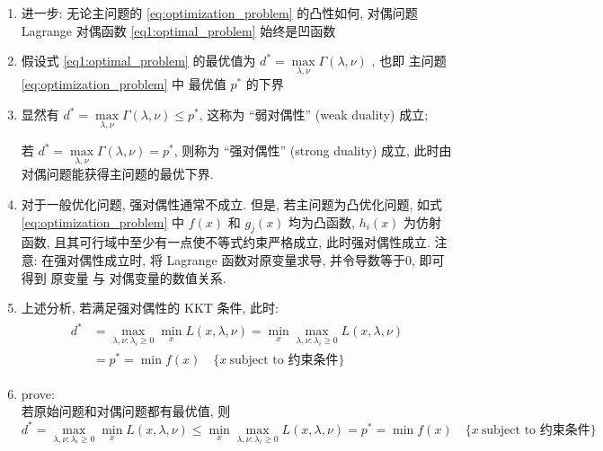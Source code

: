 \documentclass[oneside, 12pt]{ctexbook}
\begin{document}
\begin{enumerate}
					\item 进一步: 无论主问题的 \ref{eq:optimization_problem} 的凸性如何, 对偶问题 Lagrange 对偶函数 \ref{eq1:optimal_problem} 始终是凹函数
					
					\item 假设式 \ref{eq1:optimal_problem} 的最优值为 $d^* = \max\limits_{\lambda, \nu} \Gamma(\lambda, \nu)$ , 也即 主问题 \ref{eq:optimization_problem} 中 最优值 $p^*$ 的下界
					
					\item 显然有 $d^* = \max\limits_{\lambda, \nu} \Gamma(\lambda, \nu) \leq p^*$, 这称为 “弱对偶性” (weak duality) 成立; 
					
					  	  若 $d^* = \max\limits_{\lambda, \nu} \Gamma(\lambda, \nu) = p^*$, 则称为 “强对偶性” (strong duality) 成立, 此时由对偶问题能获得主问题的最优下界. 
						
					\item 对于一般优化问题, 强对偶性通常不成立. 但是, 若主问题为凸优化问题, 如式 \ref{eq:optimization_problem} 中 $f(x)$ 和 $g_j(x)$ 均为凸函数, $h_i(x)$ 为仿射函数, 且其可行域中至少有一点使不等式约束严格成立, 此时强对偶性成立. 注意: 在强对偶性成立时, 将 Lagrange 函数对原变量求导, 并令导数等于0, 即可得到 原变量 与 对偶变量的数值关系. 
					
					\item 上述分析, 若满足强对偶性的 KKT 条件, 此时: 
						\begin{align}
							\begin{split}
								d^* &= \max\limits_{\lambda, \nu: \lambda_i \geq 0} \min\limits_x L(x, \lambda, \nu) = \min\limits_x\max\limits_{\lambda, \nu: \lambda_i \geq 0} L(x, \lambda, \nu) \\
								&= p^* = \min f(x) \quad \{ x \ \text{subject to 约束条件} \}
							\end{split}
						\end{align}
					 
					 \item prove:\\ 若原始问题和对偶问题都有最优值, 则 $d^* = \max\limits_{\lambda, \nu: \lambda_i \geq 0} \min\limits_x L(x, \lambda, \nu) \leq \min\limits_x\max\limits_{\lambda, \nu: \lambda_i \geq 0} L(x, \lambda, \nu) 
					 = p^* = \min f(x) \quad \{ x \ \text{subject to 约束条件} \}$
					 

\end{enumerate}
\end{document}
